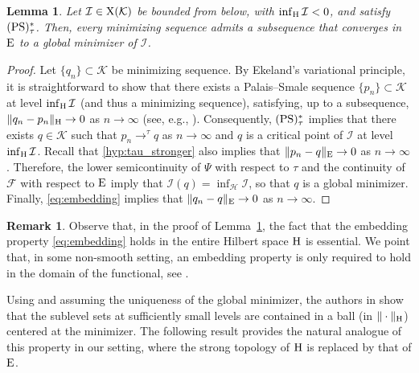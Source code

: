 \documentclass{article}
\newcommand{\boK}{\mathcal{K}}
\newcommand{\boI}{\mathcal{I}}
\newcommand{\boF}{\mathcal{F}}
\newcommand{\boH}{\mathcal{H}}
\newcommand{\Hilb}{{\textnormal H}}
\newcommand{\Ebanach}{{\textnormal E}}
\newcommand{\X}{{\textnormal X}}
\newcommand{\PS}{(\textnormal{PS})^{*}_\tau}
\newtheorem{lemma}{Lemma}[section]
\theoremstyle{definition}
\newtheorem{remark}{Remark}[section]
\begin{document}
\begin{lemma}\label{lemma:abstract-minimizer}
	Let $\boI\in\X(\boK)$ be bounded from below, with $\inf_\Hilb\boI<0$, and satisfy $\PS$. Then, every minimizing sequence admits a subsequence that converges in $\Ebanach$ to a global minimizer of $\boI$.
\end{lemma}
\begin{proof}
Let $\{q_n\}\subset\boK$ be minimizing sequence. By Ekeland's variational principle, it is straightforward to show that  there exists a Palais--Smale sequence $\{p_n\}\subset\boK$ at level $\inf_\Hilb\boI$ (and thus a minimizing sequence),  satisfying, up to a subsequence, $\|q_n-p_n\|_\Hilb\to 0$ as $n\to\infty$ (see, e.g., \cite[Proposition 1.6 and Theorem~1.7]{Szu}).  Consequently, $\PS$ implies that there exists $q\in\boK$ such that $p_n\to^\tau q$ as $n\to\infty$ and $q$ is a critical point of $\boI$ at level $\inf_\Hilb\boI$. Recall that \eqref{hyp:tau_stronger} also implies that $\|p_n-q\|_\Ebanach\to 0$ as $n\to\infty$. Therefore, the lower semicontinuity of $\Psi$ with respect to $\tau$ and the continuity of $\boF$ with respect to $\Ebanach$ imply that $\boI(q)=\inf_\boH\boI$, so that $q$ is a global minimizer. Finally, \eqref{eq:embedding} implies that $\|q_n-q\|_\Ebanach\to 0$ as $n\to\infty$.
\end{proof}

\begin{remark}
    Observe that, in the proof of Lemma~\ref{lemma:abstract-minimizer}, the fact that the embedding property \eqref{eq:embedding} holds in the entire Hilbert space $\Hilb$ is essential. We point that, in some non-smooth setting, an embedding property is only required to hold in the domain of the functional, see \cite[Theorem 2.1]{Bos}.
\end{remark}

Using \cite[Proposition 2]{Bre-Nir} and assuming the uniqueness of the global minimizer, the authors in \cite{Bre-Nir} show that the sublevel sets at sufficiently small levels are contained in a ball (in $\|\cdot\|_\Hilb$) centered at the minimizer. The following result provides the natural analogue of this property in our setting, where the strong topology of $\Hilb$ is replaced by that of $\Ebanach$.
\end{document}
